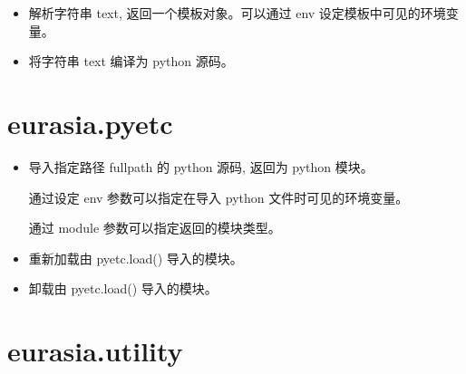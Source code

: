 \documentclass{manual}
\begin{document}
\begin{itemize}

\item {}

解析字符串 text, 返回一个模板对象。可以通过 env 设定模板中可见的环境变量。

\item {}

将字符串 text 编译为 python 源码。

\end{itemize}

\section{eurasia.pyetc}

\begin{itemize}

\item {}

导入指定路径 fullpath 的 python 源码, 返回为 python 模块。

通过设定  env 参数可以指定在导入 python 文件时可见的环境变量。

通过 module 参数可以指定返回的模块类型。

\item {}

重新加载由 pyetc.load() 导入的模块。

\item {}

卸载由 pyetc.load() 导入的模块。

\end{itemize}

\section{eurasia.utility}
\end{document}
